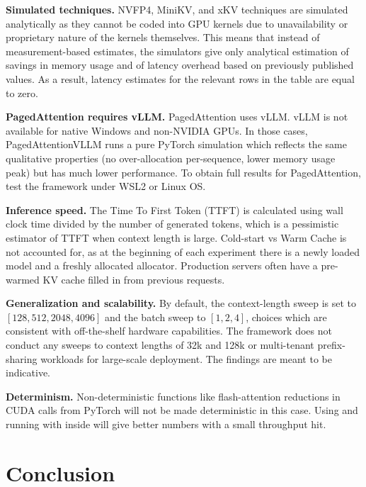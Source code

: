 \documentclass[conference]{IEEEtran}
\begin{document}
{\noindent\textbf{Simulated techniques.} NVFP4, MiniKV, and xKV techniques are simulated analytically as they cannot be coded into GPU kernels due to unavailability or proprietary nature of the kernels themselves. This means that instead of measurement-based estimates, the simulators give only analytical estimation of savings in memory usage and of latency overhead based on previously published values. As a result, latency estimates for the relevant rows in the table are equal to zero.

\noindent\textbf{PagedAttention requires vLLM.} PagedAttention uses vLLM. vLLM is not available for native Windows and non-NVIDIA GPUs. In those cases, PagedAttentionVLLM runs a pure PyTorch simulation which reflects the same qualitative properties (no over-allocation per-sequence, lower memory usage peak) but has much lower performance. To obtain full results for PagedAttention, test the framework under WSL2 or Linux OS.

\noindent\textbf{Inference speed.} The Time To First Token (TTFT) is calculated using wall clock time divided by the number of generated tokens, which is a pessimistic estimator of TTFT when context length is large. Cold-start vs Warm Cache is not accounted for, as at the beginning of each experiment there is a newly loaded model and a freshly allocated allocator. Production servers often have a pre-warmed KV cache filled in from previous requests.

\noindent\textbf{Generalization and scalability.} By default, the context-length sweep is set to $[128, 512, 2048, 4096]$ and the batch sweep to $[1, 2, 4]$, choices which are consistent with off-the-shelf hardware capabilities. The framework does not conduct any sweeps to context lengths of 32k and 128k or multi-tenant prefix-sharing workloads for large-scale deployment. The findings are meant to be indicative.

\noindent\textbf{Determinism.} Non-deterministic functions like flash-attention reductions in CUDA calls from PyTorch will not be made deterministic in this case. Using  and running with  inside  will give better numbers with a small throughput hit.
\par}

\section{Conclusion}
\label{sec:conclusion}
\end{document}
